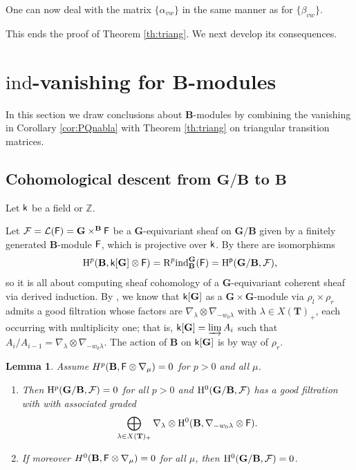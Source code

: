 \documentclass[sn-mathphys-num]{sn-jnl}%
\newcommand{\Ff}{\mathcal F}
\newcommand{\Ll}{\mathcal L}
\newcommand{\RR}{\mathrm R}
\newcommand{\ind}{{\mathrm{ind}}}
\newcommand{\sk}{{\sf k}}
\newcommand{\Z}{{\mathbb Z}}
\newcommand{\bg}{\mathbf G}
\newcommand{\fb}{\mathbf B}
\newcommand{\bt}{\mathbf T}
\newtheorem{lemma}[theorem]{Lemma}
\theoremstyle{definition}
\begin{document}
One can now deal with the matrix  $\{\alpha_{vw}\}$
in the same manner as for  $\{\beta_{vw}\}$. 

This ends the proof of Theorem \ref{th:triang}.
We next develop its consequences.

\section{$\ind$-vanishing for $\fb$-modules}\label{sec:b-cohom_vanish}
In this section we draw conclusions about $\fb$-modules by combining  the vanishing in Corollary \ref{cor:PQnabla} with Theorem \ref{th:triang} on triangular transition matrices. 
\subsection{Cohomological descent from $ \bg/ \fb$ to $\fb$}\label{subsec:cohdesc}
Let $\sk$ be a field or $\Z$.

Let $\Ff=\Ll ({\sf F})={ \bg}\times ^{\fb}\sf F$ be a $ \bg$-equivariant sheaf on $ \bg/ \fb$ given by a finitely generated $\fb$-module $\sf F$, which is projective over $\sk$. By  \cite[I 3.3, Proposition 5.12]{Jan}  there are isomorphisms 
\begin{equation}\label{eq:cohdescent}
{\rm H}^p({\fb},\sk[{ \bg}]\otimes {\sf F})=\RR^p\ind _{\fb}^{ \bg}(\sf F)={\rm H}^{p}({ \bg/\fb},\Ff),
\end{equation} 
 so it is all about computing sheaf cohomology of a $ \bg$-equivariant coherent sheaf via derived induction.
By \cite[II, Proposition 4.20, B.8]{Jan}, we know that  $\sk[ \bg]$ as a ${ \bg}\times { \bg}$-module via $\rho _l\times \rho _r$ admits a good filtration whose factors are $\nabla _{\lambda}\otimes \nabla _{-w_0\lambda}$ 
with $\lambda \in X({\bt})_+$, each occurring with multiplicity one; that is, $\sk[ \bg]=\varinjlim A_i$ such that $A_i/A_{i-1}=\nabla _{\lambda}\otimes \nabla _{-w_0\lambda}$. The action of ${\fb}$ on $\sk[ \bg]$ is by way of $\rho _r$. 

\begin{lemma}\label{lem:cohdescentlemma}
Assume $H^p(\fb,{\sf F}\otimes\nabla _{\mu})=0$ for $p>0$ and all $\mu$. 
\begin{enumerate}\item Then ${\rm H}^{p}({ \bg/\fb},\Ff)=0$ for all $p> 0$ and ${\rm H}^{0}({ \bg/\fb},\Ff)$ has a good filtration with with associated graded 
$$\bigoplus _{\lambda \in X({\bt})_+}\nabla _{\lambda}\otimes{\rm H}^0({\fb}, \nabla _{-w_0\lambda}\otimes {\sf F}).$$
\item If moreover $H^0(\fb,{\sf F}\otimes\nabla _{\mu})=0$ for all $\mu$, then ${\rm H}^{0}({ \bg/\fb},\Ff)=0$.
\end{enumerate}
\end{lemma}
\end{document}
